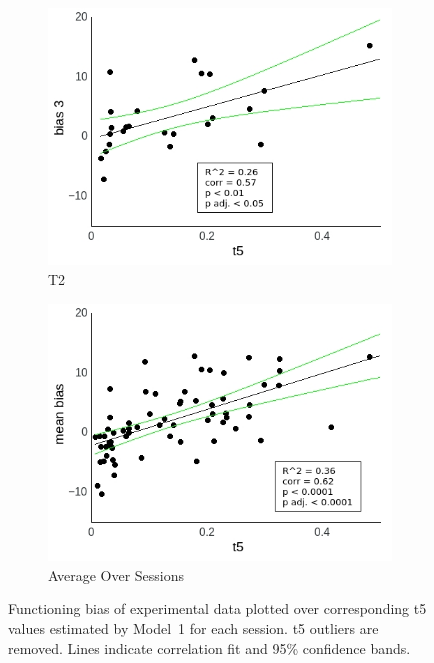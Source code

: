 \documentclass[a4paper]{scrreprt}
\begin{document}
\begin{figure}
\begin{subfigure}[b]{0.49\textwidth}
        \includegraphics[width=\textwidth]{figs/sec3/t5/t5no_diff_3_mod1dat.jpeg}
        \caption{T2}
    \end{subfigure}
    \begin{subfigure}[b]{0.49\textwidth}
        \includegraphics[width=\textwidth]{figs/sec3/t5/t5no_diff_mean_mod1dat.jpeg}
        \caption{Average Over Sessions}
    \end{subfigure}
\caption{Functioning bias of experimental data plotted over corresponding t5 values estimated by Model~1 for each session. t5 outliers are removed. Lines indicate correlation fit and 95\% confidence bands.}
\label{fig:t5no_diff_mod1dat}
\end{figure}
\end{document}
